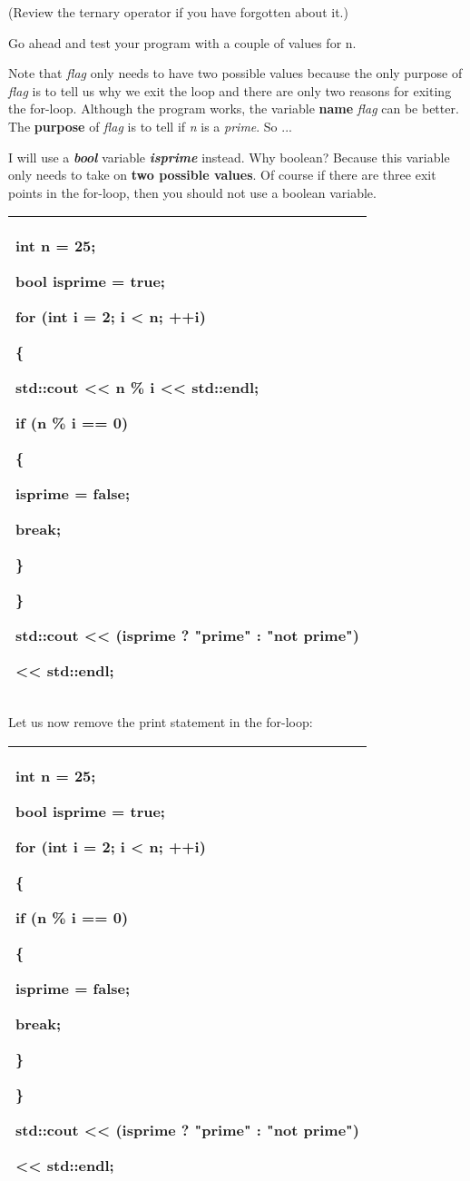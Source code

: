 \documentclass[
]{article}
\begin{document}
(Review the ternary operator if you have forgotten about it.)

Go ahead and test your program with a couple of values for n.

Note that \emph{flag} only needs to have two possible values because the
only purpose of \emph{flag} is to tell us why we exit the loop and there
are only two reasons for exiting the for-loop. Although the program
works, the variable \textbf{name} \emph{flag} can be better. The
\textbf{purpose} of \emph{flag} is to tell if \emph{n} is a
\emph{prime}. So ...

I will use a \emph{\textbf{bool}} variable \emph{\textbf{isprime}}
instead. Why boolean? Because this variable only needs to take on
\textbf{two possible values}. Of course if there are three exit points
in the for-loop, then you should not use a boolean variable.

\begin{longtable}[]{@{}l@{}}
\toprule
\endhead
\begin{minipage}[t]{0.97\columnwidth}\raggedright
int n = 25;

bool isprime = true;

for (int i = 2; i \textless{} n; ++i)

\{

std::cout \textless\textless{} n \% i \textless\textless{} std::endl;

if (n \% i == 0)

\{

isprime = false;

break;

\}

\}

std::cout \textless\textless{} (isprime ? "prime" : "not prime")

\textless\textless{} std::endl;\strut
\end{minipage}\tabularnewline
\bottomrule
\end{longtable}

Let us now remove the print statement in the for-loop:

\begin{longtable}[]{@{}l@{}}
\toprule
\endhead
\begin{minipage}[t]{0.97\columnwidth}\raggedright
int n = 25;

bool isprime = true;

for (int i = 2; i \textless{} n; ++i)

\{

if (n \% i == 0)

\{

isprime = false;

break;

\}

\}

std::cout \textless\textless{} (isprime ? "prime" : "not prime")

\textless\textless{} std::endl;\strut
\end{minipage}\tabularnewline
\bottomrule
\end{longtable}
\end{document}
